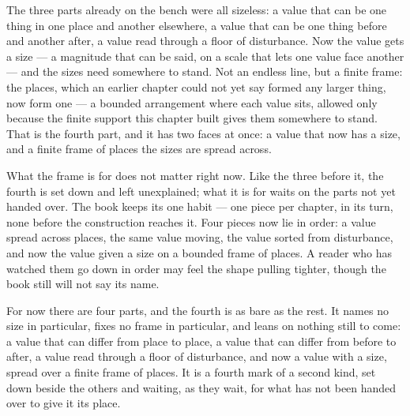 The three parts already on the bench were all sizeless: a value that can be one thing in one place and another elsewhere, a value that can be one thing before and another after, a value read through a floor of disturbance. Now the value gets a size --- a magnitude that can be said, on a scale that lets one value face another --- and the sizes need somewhere to stand. Not an endless line, but a finite frame: the places, which an earlier chapter could not yet say formed any larger thing, now form one --- a bounded arrangement where each value sits, allowed only because the finite support this chapter built gives them somewhere to stand. That is the fourth part, and it has two faces at once: a value that now has a size, and a finite frame of places the sizes are spread across.

What the frame is for does not matter right now. Like the three before it, the fourth is set down and left unexplained; what it is for waits on the parts not yet handed over. The book keeps its one habit --- one piece per chapter, in its turn, none before the construction reaches it. Four pieces now lie in order: a value spread across places, the same value moving, the value sorted from disturbance, and now the value given a size on a bounded frame of places. A reader who has watched them go down in order may feel the shape pulling tighter, though the book still will not say its name.

For now there are four parts, and the fourth is as bare as the rest. It names no size in particular, fixes no frame in particular, and leans on nothing still to come: a value that can differ from place to place, a value that can differ from before to after, a value read through a floor of disturbance, and now a value with a size, spread over a finite frame of places. It is a fourth mark of a second kind, set down beside the others and waiting, as they wait, for what has not been handed over to give it its place.
